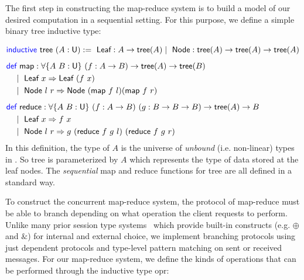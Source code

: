 The first step in constructing the map-reduce system is to build a model of our desired
computation in a sequential setting. For this purpose, we define a simple binary tree
inductive type:

\vspace{-1em}
\begingroup
\small
\addtolength{\jot}{-0.25em}
\begin{alignat*}{4}
  &\Inductive\ \textsf{tree}\ (A : \Un) :=\
    \textsf{Leaf} : A \rightarrow \textsf{tree}(A) \mid\
    \textsf{Node} : \textsf{tree}(A) \rightarrow \textsf{tree}(A) \rightarrow \textsf{tree}(A)
  \\[0.4em]
  &\begin{alignedat}{4}
    &\Def\ \textsf{map} : \forall \{A\ B : \Un\}\ (f : A \rightarrow B) \rightarrow \textsf{tree}(A) \rightarrow \textsf{tree}(B) \\
    &\quad\mid\ \textsf{Leaf}\ x \Rightarrow \textsf{Leaf}\ (f\ x) \\
    &\quad\mid\ \textsf{Node}\ l\ r \Rightarrow \textsf{Node}\ (\textsf{map}\ f\ l) (\textsf{map}\ f\ r)
  \end{alignedat}
  \\[0.4em]
  &\begin{alignedat}{4}
    &\Def\ \textsf{reduce} : \forall \{A\ B : \Un\}\ (f : A \rightarrow B)\ (g : B \rightarrow B \rightarrow B) \rightarrow \textsf{tree}(A) \rightarrow B \\
    &\quad\mid\ \textsf{Leaf}\ x \Rightarrow f\ x \\
    &\quad\mid\ \textsf{Node}\ l\ r \Rightarrow g\ (\textsf{reduce}\ f\ g\ l)\ (\textsf{reduce}\ f\ g\ r)
  \end{alignedat}
\end{alignat*}
\endgroup
In this definition, the type \Un{} of $A$ is the universe of \emph{unbound}
(i.e. non-linear) types in \TLLC{}. So \textsf{tree} is parameterized by $A$
which represents the type of data stored at the leaf nodes. The \emph{sequential}
\textsf{map} and \textsf{reduce} functions for \textsf{tree} are all defined in a standard way.

To construct the concurrent map-reduce system, the protocol of map-reduce must
be able to branch depending on what operation the client requests to perform.
Unlike many prior session type systems~\cite{caires10,das20} which provide
built-in constructs (e.g. $\oplus$ and $\&$) for internal and external choice,
we implement branching protocols using just dependent protocols and type-level
pattern matching on sent or received messages. For our map-reduce system, we
define the kinds of operations that can be performed through the inductive type
\textsf{opr}:

